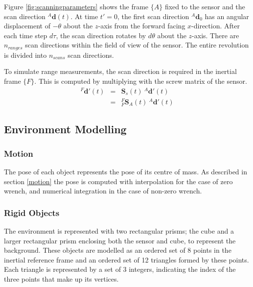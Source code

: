 Figure \ref{fig:scanningparameters} shows the frame $\{A\}$ fixed to the sensor and the scan direction ${^{A}\mathbf{d}(t)}$. At time $t' = 0$, the first scan direction ${^{A}\mathbf{d}_0}$ has an angular displacement of $-\theta$ about the $z$-axis from the forward facing $x$-direction. After each time step $d\tau$, the scan direction rotates by $d\theta$ about the $z$-axis. There are $n_{ranges}$ scan directions within the field of view of the sensor. The entire revolution is divided into $n_{scans}$ scan directions.


To simulate range measurements, the scan direction is required in the inertial frame $\{F\}$. This is computed by multiplying with the screw matrix of the sensor.
\begin{equation}
	\begin{array}{lcl}
	{^{F}\mathbf{d'}(t)} & = & \mathbf{S}_s(t)\:{^{A}\mathbf{d'}(t)} \\
	& = & {^{F}_{F}\mathbf{S}^{}_{A}(t)}\:{^{A}\mathbf{d'}(t)}
	\end{array}
\end{equation}

\subsection{Environment Modelling}
\subsubsection{Motion}
The pose of each object represents the pose of its centre of mass. As described in section \ref{motion} the pose is computed with interpolation for the case of zero wrench, and numerical integration in the case of non-zero wrench.

\subsubsection{Rigid Objects}
The environment is represented with two rectangular prisms; the cube and a larger rectangular prism enclosing both the sensor and cube, to represent the background. These objects are modelled as an ordered set of 8 points in the inertial reference frame and an ordered set of 12 triangles formed by these points. Each triangle is represented by a set of 3 integers, indicating the index of the three points that make up its vertices.

